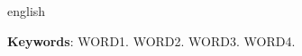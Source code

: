 \begin{resumo}[Abstract]
	\begin{otherlanguage*}{english}
		\lipsum[2-2]
		
		\vspace{\onelineskip}
		\noindent 
		\textbf{Keywords}: WORD1. WORD2. WORD3. WORD4.
	\end{otherlanguage*}
\end{resumo}